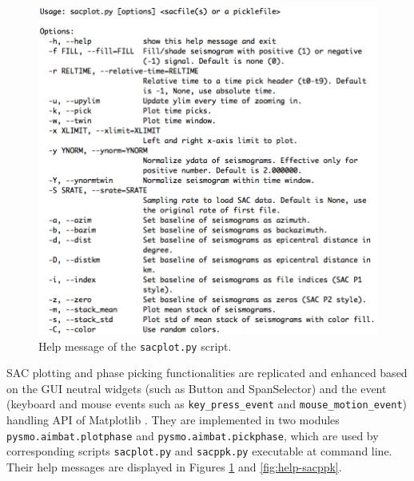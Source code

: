 \documentclass[12pt, titlepage]{article}
\begin{document}
\begin{figure}[!b]
    \centering
    \vspace{2em}
    \includegraphics[width = 0.94 \textwidth]{figs/help-sacplot.png}
    \caption{Help message of the \texttt{sacplot.py} script. }
    \label{fig:help-sacplot}
\end{figure}


SAC plotting and phase picking functionalities are replicated and enhanced based on the GUI neutral widgets (such as Button and SpanSelector) and the event (keyboard and mouse events such as \texttt{key\_press\_event} and \texttt{mouse\_motion\_event}) handling API of Matplotlib \citep{matplotlib}.
They are implemented in two modules \texttt{pysmo.aimbat.plotphase} and \texttt{pysmo.aimbat.pickphase}, which are used by corresponding scripts \texttt{sacplot.py} and \texttt{sacppk.py} executable at command line. Their help messages are displayed in Figures \ref{fig:help-sacplot} and \ref{fig:help-sacppk}.
\end{document}
